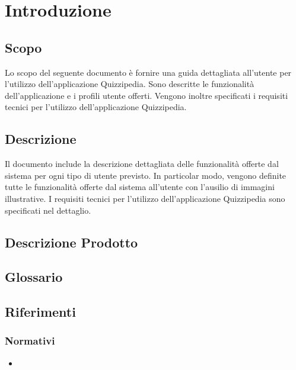 \documentclass[12pt,a4paper]{article}
\begin{document}
	\newpage
	\tableofcontents
	\newpage
	\listoftables
	\listoffigures
	\newpage
	
	
	\section{Introduzione}	\label{intro}
	
	\subsection{Scopo}
	Lo scopo del seguente documento è fornire una guida dettagliata all’utente per l’utilizzo dell’applicazione Quizzipedia. Sono descritte le funzionalità dell'applicazione e i profili utente offerti.
	Vengono inoltre specificati i requisiti tecnici per l'utilizzo dell'applicazione Quizzipedia.

	\subsection{Descrizione}
    Il documento include la descrizione dettagliata delle funzionalità offerte dal sistema per ogni tipo di utente previsto. In particolar modo, vengono definite tutte le funzionalità offerte dal sistema all’utente con l’ausilio di immagini illustrative. 
    I requisiti tecnici per l'utilizzo dell'applicazione Quizzipedia sono specificati nel dettaglio.
	
	\subsection{Descrizione Prodotto}
	\descrizioneProdotto
	
	\subsection{Glossario}
	\glossarioPrint
	
	\subsection{Riferimenti}
	
	\subsubsection{Normativi}
	\begin{itemize}
		\item
		
	\end{itemize}
	
\end{document}
